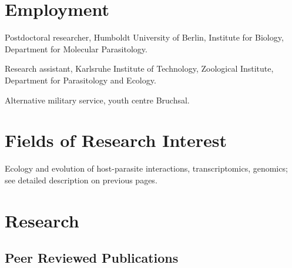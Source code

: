 \documentclass[10pt,A4paper]{article}
\renewenvironment{itemize}{
  \begin{list}{}{
    \setlength{\leftmargin}{1.5em}
    \setlength{\itemsep}{0.25em}
    \setlength{\parskip}{0pt}
    \setlength{\parsep}{0.25em}
  }
}{
  \end{list}
}
\begin{document}
\section*{Employment}

\begin{itemize}
\item [March 2012 - now] Postdoctoral researcher, Humboldt University of
  Berlin, Institute for Biology, Department for Molecular
  Parasitology.
\item [Jun 2008- Jul 2011] Research assistant, Karlsruhe Institute of
  Technology, Zoological Institute, Department for Parasitology and
  Ecology.
\item [2000-2001] Alternative military service, youth centre Bruchsal.
\end{itemize}


\section*{Fields of Research Interest}
Ecology and evolution of host-parasite interactions, transcriptomics,
genomics; see detailed description on previous pages.

\section*{Research}

\subsection*{Peer Reviewed Publications}
\end{document}
